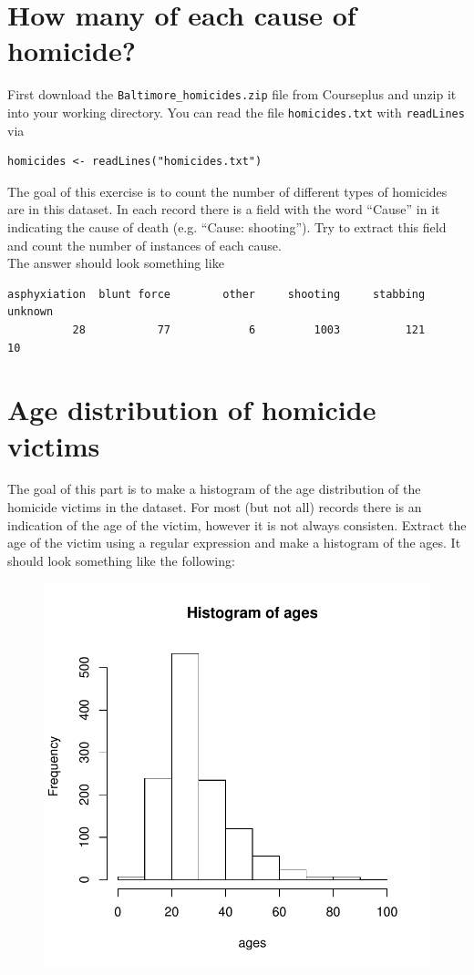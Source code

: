 \documentclass{article}
\newcommand{\code}{\texttt}
\begin{document}
\section*{How many of each cause of homicide?}

First download the \code{Baltimore\_homicides.zip} file from
Courseplus and unzip it into your working directory. You can read the
file \code{homicides.txt} with \code{readLines} via
\begin{verbatim}
homicides <- readLines("homicides.txt")
\end{verbatim}
The goal of this exercise is to count the number of different types of
homicides are in this dataset. In each record there is a field with
the word ``Cause'' in it indicating the cause of death (e.g. ``Cause:
shooting''). Try to extract this field and count the number of
instances of each cause.\\

The answer should look something like
\begin{verbatim}
asphyxiation  blunt force        other     shooting     stabbing      unknown 
          28           77            6         1003          121           10 
\end{verbatim}


\section*{Age distribution of homicide victims}

The goal of this part is to make a histogram of the age distribution
of the homicide victims in the dataset. For most (but not all) records
there is an indication of the age of the victim, however it is not
always consisten. Extract the age of the victim using a regular
expression and make a histogram of the ages. It should look something
like the following:
\begin{figure}[h]
\includegraphics{homicide-ages}
\end{figure}
\end{document}

